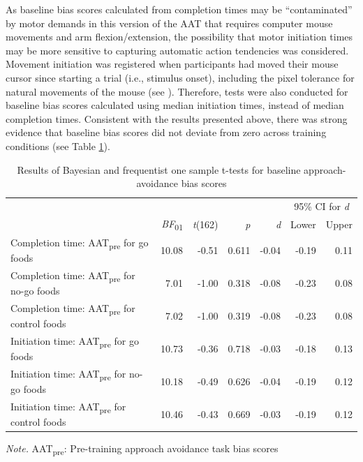 \documentclass[man,floatsintext]{apa6}
\begin{document}
\par

As baseline bias scores calculated from completion times may be \enquote{contaminated} by motor demands in this version of the AAT that requires computer mouse movements and arm flexion/extension, the possibility that motor initiation times may be more sensitive to capturing automatic action tendencies was considered. Movement initiation was registered when participants had moved their mouse cursor since starting a trial (i.e., stimulus onset), including the pixel tolerance for natural movements of the mouse (see \textit{}). Therefore, tests were also conducted for baseline bias scores calculated using median initiation times, instead of median completion times. Consistent with the results presented above, there was strong evidence that baseline bias scores did not deviate from zero across training conditions (see Table \ref{tab:baseline}).

\begin{table}[h] 
    \centering
    \caption{Results of Bayesian and frequentist one sample t-tests for baseline approach-avoidance bias scores}
    \label{tab:baseline}
    {
        \begin{tabular}{lrrrrrr}
            \toprule
             &  &  &  & & \multicolumn{2}{c}{95\% CI for \textit{d}} \\
            \cline{6-7}
             & \textit{BF}\textsubscript{01}  & \textit{t}(162) & \textit{p} & \textit{d} & Lower & Upper \\
            \cmidrule(r){1-7}
            Completion time: AAT\textsubscript{pre} for go foods  & 10.08 & -0.51& 0.611 & -0.04 & -0.19 & 0.11  \\
            Completion time: AAT\textsubscript{pre} for no-go foods  & 7.01 & -1.00 & 0.318 & -0.08 & -0.23 & 0.08 \\
            Completion time: AAT\textsubscript{pre} for control foods  & 7.02 & -1.00 & 0.319 & -0.08 & -0.23 & 0.08 \\
            Initiation time: AAT\textsubscript{pre} for go foods  & 10.73 & -0.36 & 0.718 & -0.03 & -0.18 & 0.13  \\
            Initiation time: AAT\textsubscript{pre} for no-go foods  & 10.18 & -0.49 & 0.626 & -0.04 & -0.19 & 0.12 \\
            Initiation time: AAT\textsubscript{pre} for control foods  & 10.46 & -0.43 & 0.669 & -0.03 & -0.19 & 0.12 \\
            \bottomrule
        \end{tabular}
    }
    \begin{tablenotes}[para]
\footnotesize{\textit{Note.} AAT\textsubscript{pre}: Pre-training approach avoidance task bias scores}
\end{tablenotes}
\end{table}
\end{document}
